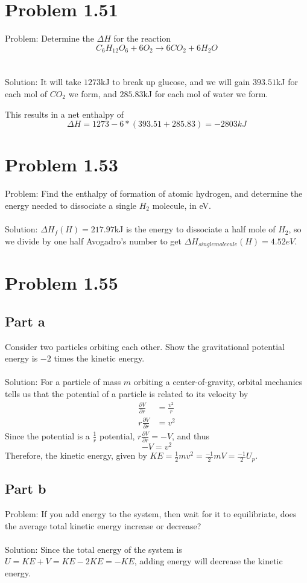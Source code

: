 \documentclass[paper=a4, fontsize=11pt]{scrartcl} %
\numberwithin{equation}{section} %
\numberwithin{figure}{section} %
\numberwithin{table}{section} %
\begin{document}
\section*{Problem 1.51}
Problem: Determine the $\Delta H$ for the reaction
\[
C_6H_{12}O_6 + 6O_2 \to 6CO_2 +6H_2O
\]
\\
\\
Solution:
It will take $1273$kJ to break up glucose, and we will gain $393.51$kJ for each mol of
$CO_2$ we form, and $285.83$kJ for each mol of water we form.

This results in a net enthalpy of
\[
\Delta H = 1273 - 6*(393.51+285.83) = -2803kJ
\]


\section*{Problem 1.53}
Problem: Find the enthalpy of formation of atomic hydrogen, and determine the energy needed to
dissociate a single $H_2$ molecule, in eV.
\\
\\
Solution:
$\Delta H_f(H) = 217.97$kJ is the energy to dissociate a half mole of $H_2$, so we divide by
one half Avogadro's number to get $\Delta H_{single molecule}(H) = 4.52eV$.


\section*{Problem 1.55}

\subsection*{Part a}
Consider two particles orbiting each other. Show the gravitational potential energy is
$-2$ times the kinetic energy.
\\
\\
Solution:
For a particle of mass $m$ orbiting a center-of-gravity, orbital mechanics tells us
that the potential of a particle is related to its velocity by
\[
\begin{aligned}
\frac{\partial V}{\partial r} &= \frac{v^2}{r}\\
r\frac{\partial V}{\partial r}&= v^2
\end{aligned}
\]
Since the potential is a $\frac{1}{r}$ potential, $r\frac{\partial V}{\partial r} = -V$, and
thus
\[
-V = v^2
\]
Therefore, the kinetic energy, given by $KE = \frac{1}{2}mv^2 = \frac{-1}{2}mV = \frac{-1}{2}U_p$.


\subsection*{Part b}
Problem: If you add energy to the system, then wait for it to equilibriate, does the
average total kinetic energy increase or decrease?
\\
\\
Solution:
Since the total energy of the system is $U = KE + V = KE - 2KE = -KE$,
adding energy will decrease the kinetic energy.
\end{document}
